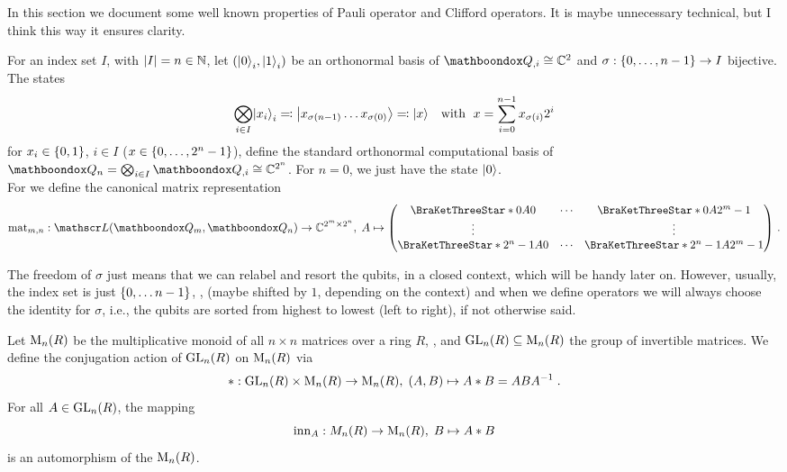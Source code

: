 \documentclass[a4paper,english]{scrartcl}
\begin{document}
In this section we document some well known properties of Pauli operator and Clifford
operators. It is maybe unnecessary technical, but I think this way it ensures clarity.
\begin{definition}\label{.computational_basis}
For an index set $I$, with $\abs{I} = n \in \N$, let $\w(\er{0}_i, \er{1}_i)$ be an
orthonormal basis of $\bh_{,i} \cong \C^2$ and $\sigma : \bc{0, \ldots, n-1} \to I$
bijective. The states
\begin{equation}
  \bigotimes_{i \in I} \er{x_i}_i \eqqcolon \er{x_{\sigma(n-1)} \ldots x_{\sigma(0)}}
  \eqqcolon \er{x} \quad \text{with }\; x = \sum_{i=0}^{n-1}x_{\sigma(i)}2^i
\end{equation}
for $x_i \in \bc{0, 1}$, $i \in I$ ($x \in \bc{0, \ldots, 2^{n}-1}$), define the
standard orthonormal computational basis of $\bh_n = \bigotimes_{i \in I} \bh_{,i} \cong
\C^{2^n}$. For $n = 0$, we just have the state $\er{0}$.\\ For \en*[m, n] we define
the canonical matrix representation
\begin{equation}
  \mathrm{mat}_{m,n} : \ls\w(\bh_m, \bh_n) \to \C^{2^m \times 2^n},\; A \mapsto
  \matp{
  \are{0}[A][0] & \cdots & \are{0}[A][2^m-1]\\
  \vdots & & \vdots\\
  \are{2^n-1}[A][0] & \cdots & \are{2^n-1}[A][2^m-1]
  }\,.
\end{equation}
\end{definition}
\begin{remark}\label{.label_freedom}
The freedom of $\sigma$ just means that we can relabel and resort the qubits, in a
closed context, which will be handy later on. However, usually, the index set is just
$\bc{0, \ldots n-1}$, \en*, (maybe shifted by $1$, depending on the context) and when we
define operators we will always choose the identity for $\sigma$, i.e., the qubits are
sorted from highest to lowest (left to right), if not otherwise said.
\end{remark}
\begin{definition_proposition}
Let $\mathrm{M}_n(R)$ be the multiplicative monoid of all $n \times n$ matrices over a ring $R$,
\en, and $\mathrm{GL}_n(R) \subseteq \mathrm{M}_n(R)$ the group of invertible matrices. We define the
conjugation action of $\mathrm{GL}_n(R)$ on $\mathrm{M}_n(R)$ via
\begin{equation}
  * : \mathrm{GL}_n(R) \times \mathrm{M}_n(R) \to \mathrm{M}_n(R),\; (A, B) \mapsto A*B = ABA^{-1} \;.
\end{equation}
For all $A \in \mathrm{GL}_n(R)$, the mapping
\begin{equation}
  \mathrm{inn}_A : M_n(R) \to \mathrm{M}_n(R),\; B \mapsto A * B
\end{equation}
is an automorphism of the $\mathrm{M}_n(R)$.
\end{definition_proposition}
\end{document}
